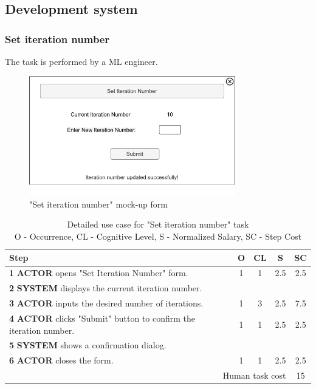 \subsection{Development system}

\subsubsection{Set iteration number}

The task is performed by a ML engineer.

\begin{figure}[H]
\centering
\includegraphics[width=0.8\textwidth]{figures/set_iteration_number.png}
\caption{"Set iteration number" mock-up form}
\end{figure}

\begin{table}[H]
\centering
\begin{tabularx}{\textwidth}{|X|c|c|c|c|}
\hline
\textbf{Step} & \textbf{O} & \textbf{CL} & \textbf{S} & \textbf{SC} \\
\hline
\textbf{1} \textbf{ACTOR} opens "Set Iteration Number" form. & 1 & 1 & 2.5 & 2.5 \\
\hline
\textbf{2} \textbf{SYSTEM} displays the current iteration number. & & & & \\
\hline
\textbf{3} \textbf{ACTOR} inputs the desired number of iterations. & 1 & 3 & 2.5 & 7.5 \\
\hline
\textbf{4} \textbf{ACTOR} clicks "Submit" button to confirm the iteration number. & 1 & 1 & 2.5 & 2.5 \\
\hline
\textbf{5} \textbf{SYSTEM} shows a confirmation dialog. & & & & \\
\hline
\textbf{6} \textbf{ACTOR} closes the form. & 1 & 1 & 2.5 & 2.5 \\
\hline
\multicolumn{4}{|r|}{Human task cost} &  15 \\
\hline
\end{tabularx}
\caption{Detailed use case for "Set iteration number" task\\ 
O - Occurrence, CL - Cognitive Level, S - Normalized Salary, SC - Step Cost}
\label{table:set_iteration_number}
\end{table}

